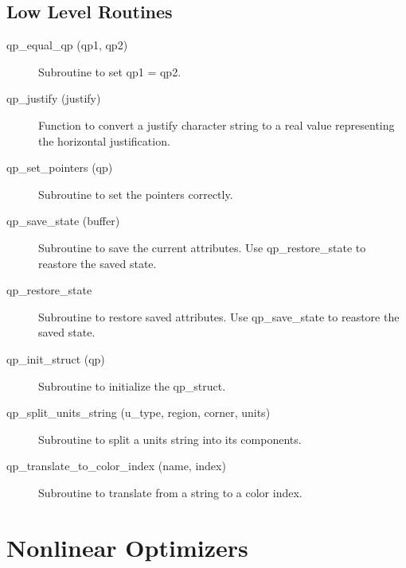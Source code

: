 \subsection{Low Level Routines}

\begin{description}

\item[qp\_equal\_qp (qp1, qp2)] \Newline 
     Subroutine to set qp1 = qp2.

\item[qp\_justify (justify)] \Newline 
     Function to convert a justify character string to a real value
     representing the horizontal justification. 

\item[qp\_set\_pointers (qp)] \Newline 
     Subroutine to set the pointers correctly.

\item[qp\_save\_state (buffer)] \Newline 
     Subroutine to save the current attributes. 
     Use qp\_restore\_state to reastore the saved state.

\item[qp\_restore\_state] \Newline 
     Subroutine to restore saved attributes. 
     Use qp\_save\_state to reastore the saved state.

\item[qp\_init\_struct (qp)] \Newline 
     Subroutine to initialize the qp\_struct.

\item[qp\_split\_units\_string (u\_type, region, corner, units)] \Newline 
     Subroutine to split a units string into its components.

\item[qp\_translate\_to\_color\_index (name, index)] \Newline 
     Subroutine to translate from a string to a color index.

\end{description}

\section{Nonlinear Optimizers}
\label{r:opti}      

